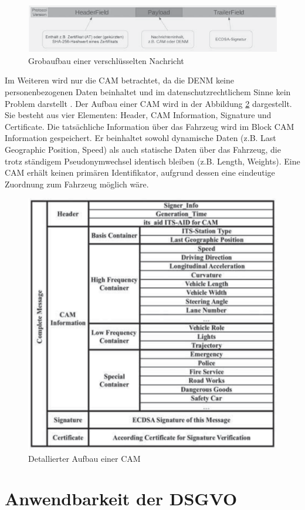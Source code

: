 \begin{figure}
	\centering
	\includegraphics[width=0.7\linewidth]{images/Nachrichtenaufbau}
	\caption[Grobaufbau einer verschlüsselten Nachricht]{Grobaufbau einer verschlüsselten Nachricht \footnotemark}
	\label{fig:nachrichtenaufbau}
\end{figure}

Im Weiteren wird nur die CAM betrachtet, da die DENM keine personenbezogenen Daten beinhaltet und im datenschutzrechtlichem Sinne kein Problem darstellt \cite{Kiometzis2017}. Der Aufbau einer CAM wird in der Abbildung \ref{fig:cam} dargestellt. Sie besteht aus vier Elementen: Header, CAM Information, Signature und Certificate. Die tatsächliche Information über das Fahrzeug wird im Block CAM Information gespeichert. Er beinhaltet sowohl dynamische Daten (z.B. Last Geographic Position, Speed) als auch statische Daten über das Fahrzeug, die trotz ständigem Pseudonymwechsel identisch bleiben (z.B. Length, Weights). Eine CAM erhält keinen primären Identifikator, aufgrund dessen eine eindeutige Zuordnung zum Fahrzeug möglich wäre.

\begin{figure}
	\centering
	\includegraphics[width=0.4\linewidth]{images/CAM}
	\caption[Detallierter Aufbau einer CAM]{Detallierter Aufbau einer CAM \footnotemark}
	\label{fig:cam}
\end{figure}

\section{Anwendbarkeit der DSGVO}
\label{sec:SecondContentSection:SecondSubsection}

